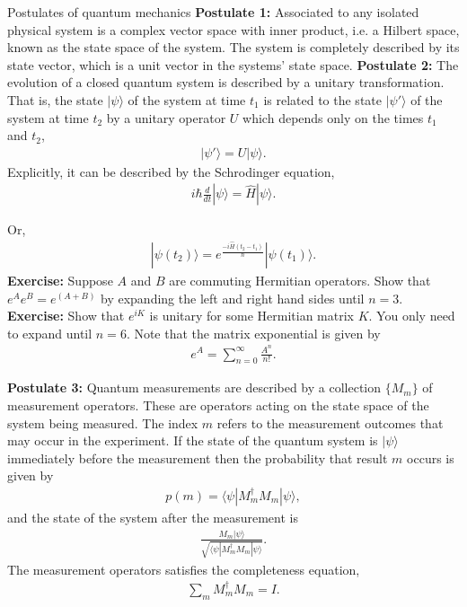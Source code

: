\documentclass{beamer}
\begin{document}
\begin{frame}{Postulates of quantum mechanics}
\justify
\textbf{Postulate 1:} Associated to any isolated physical system is a complex vector space with inner product, i.e. a Hilbert space, known as the state space of the system. The system is completely described by its state vector, which is a unit vector in the systems' state space.
\vfill
\textbf{Postulate 2:} The evolution of a closed quantum system is described by a unitary transformation. That is, the state $|\psi\rangle$ of the system at time $t_1$ is related to the state $|\psi'\rangle$ of the system at time $t_2$ by a unitary operator $U$ which depends only on the times $t_1$ and $t_2$,
\begin{align}
|\psi'\rangle = U |\psi\rangle.
\end{align}
Explicitly, it can be described by the Schrodinger equation,
\begin{align}
i \hbar \frac{d}{dt} |\psi\rangle = \hat{H} |\psi\rangle.
\end{align}
\end{frame}

\begin{frame}
\justify
Or,
\begin{align}
|\psi(t_2)\rangle = e^{\frac{-i\hat{H}(t_2-t_1)}{\hbar}} |\psi(t_1)\rangle.
\end{align}
\vfill
\textbf{Exercise:} Suppose $A$ and $B$ are commuting Hermitian operators. Show that $e^A e^B = e^{(A+B)}$ by expanding the left and right hand sides until $n=3$.
\vfill
\textbf{Exercise:} Show that $e^{iK}$ is unitary for some Hermitian matrix $K$. You only need to expand until $n=6$.
\vfill
Note that the matrix exponential is given by
\begin{align}
e^A = \sum_{n=0}^\infty \frac{A^n}{n!}.
\end{align}
\end{frame}

\begin{frame}
\justify
\textbf{Postulate 3:} Quantum measurements are described by a collection $\{M_m\}$ of measurement operators. These are operators acting on the state space of the system being measured. The index $m$ refers to the measurement outcomes that may occur in the experiment. If the state of the quantum system is $|\psi\rangle$ immediately before the measurement then the probability that result $m$ occurs is given by
\begin{align}
p(m) = \langle \psi | M_m^\dagger M_m | \psi\rangle,
\end{align}
and the state of the system after the measurement is
\begin{align}
\frac{M_m|\psi\rangle}{\sqrt{\langle \psi | M_m^\dagger M_m | \psi\rangle}}.
\end{align}
The measurement operators satisfies the completeness equation,
\begin{align}
\sum_m M_m^\dagger M_m = I.
\end{align}
\end{frame}
\end{document}
